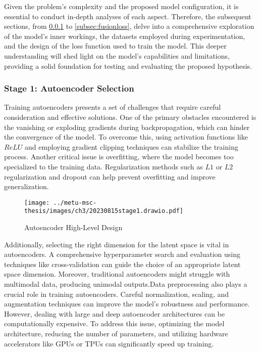 Given the problem's complexity and the proposed model configuration, it is essential to conduct in-depth analyses of each aspect. Therefore, the subsequent sections, from \ref{subsec:aesel} to \ref{subsec:fusionloss}, delve into a comprehensive exploration of the model's inner workings, the datasets employed during experimentation, and the design of the loss function used to train the model. This deeper understanding will shed light on the model's capabilities and limitations, providing a solid foundation for testing and evaluating the proposed hypothesis.

\subsubsection{Stage 1: Autoencoder Selection} \label{subsec:aesel}

Training autoencoders presents a set of challenges that require careful consideration and effective solutions. One of the primary obstacles encountered is the vanishing or exploding gradients during backpropagation, which can hinder the convergence of the model. To overcome this, using activation functions like $ReLU$ and employing gradient clipping techniques can stabilize the training process. Another critical issue is overfitting, where the model becomes too specialized to the training data. Regularization methods such as $L1$ or $L2$ regularization and dropout can help prevent overfitting and improve generalization.

\begin{figure}[htbp]
    \centering
    \texttt{[image: ../metu-msc-thesis/images/ch3/20230815stage1.drawio.pdf]}
    \centering
    \caption{Autoencoder High-Level Design}
    \label{fig:ch3:encoderhighlevel}
\end{figure}

Additionally, selecting the right dimension for the latent space is vital in autoencoders. A comprehensive hyperparameter search and evaluation using techniques like cross-validation can guide the choice of an appropriate latent space dimension. Moreover, traditional autoencoders might struggle with multimodal data, producing unimodal outputs.Data preprocessing also plays a crucial role in training autoencoders. Careful normalization, scaling, and augmentation techniques can improve the model's robustness and performance. However, dealing with large and deep autoencoder architectures can be computationally expensive. To address this issue, optimizing the model architecture, reducing the number of parameters, and utilizing hardware accelerators like GPUs or TPUs can significantly speed up training.

